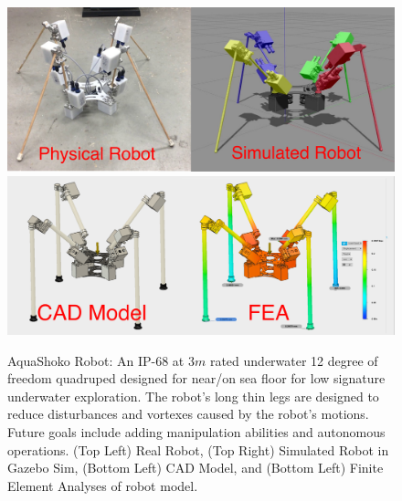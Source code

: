 \begin{figure}[!t]
\centering
\includegraphics[width=1.0\columnwidth]{img/aquashoko-2.pdf}
\includegraphics[width=1.0\columnwidth]{img/aquaShoko-fea-cad.pdf}
\caption{AquaShoko Robot: An IP-68 at 3$m$ rated underwater 12 degree of freedom quadruped designed for near/on sea floor for low signature underwater exploration.  The robot's long thin legs are designed to reduce disturbances and vortexes caused by the robot's motions. Future goals include adding manipulation abilities and autonomous operations. (Top Left) Real Robot, (Top Right) Simulated Robot in Gazebo Sim, (Bottom Left) CAD Model, and (Bottom Left) Finite Element Analyses of robot model. }
\label{fig:cover}
\end{figure}  
